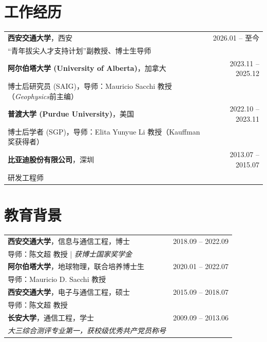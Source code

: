 \documentclass[11pt,a4paper]{article}
\begin{document}
\section{工作经历}
\noindent
\begin{tabularx}{\textwidth}{@{}Xr@{}}
\textbf{西安交通大学}，西安 & 2026.01 -- 至今 \\
“青年拔尖人才支持计划”副教授、博士生导师 & \\[4pt]
\textbf{阿尔伯塔大学 (University of Alberta)}，加拿大 & 2023.11 -- 2025.12 \\
博士后研究员 (SAIG)，导师：Mauricio Sacchi 教授 （\textit{Geophysics}前主编） & \\[4pt]
\textbf{普渡大学 (Purdue University)}，美国 & 2022.10 -- 2023.11 \\
博士后学者 (SGP)，导师：Elita Yunyue Li 教授（Kauffman奖获得者） & \\[4pt]
\textbf{比亚迪股份有限公司}，深圳 & 2013.07 -- 2015.07 \\
研发工程师 & 
\end{tabularx}

\section{教育背景}
\noindent
\begin{tabularx}{\textwidth}{@{}Xr@{}}
\textbf{西安交通大学}，信息与通信工程，博士 & 2018.09 -- 2022.09 \\
\small{导师：陈文超 教授 | \textit{获博士国家奖学金}} & \\[4pt]
\textbf{阿尔伯塔大学}，地球物理，联合培养博士生 & 2020.01 -- 2022.07 \\
\small{导师：Mauricio D. Sacchi 教授} & \\[4pt]
\textbf{西安交通大学}，电子与通信工程，硕士 & 2015.09 -- 2018.07 \\
\small{导师：陈文超 教授} & \\[4pt]
\textbf{长安大学}，通信工程，学士 & 2009.09 -- 2013.06 \\
\small{\textit{大三综合测评专业第一，获校级优秀共产党员称号}} &
\end{tabularx}

\end{document}
